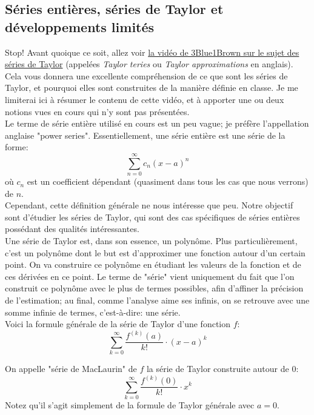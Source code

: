 \documentclass{article}
\begin{document}
\subsection{Séries entières, séries de Taylor et développements limités}
Stop! Avant quoique ce soit, allez voir \href{https://www.youtube.com/watch?v=3d6DsjIBzJ4}{la vidéo de 3Blue1Brown sur le sujet des séries de Taylor} (appelées \emph{Taylor teries} ou \emph{Taylor approximations} en anglais). Cela vous donnera une excellente compréhension de ce que sont les séries de Taylor, et pourquoi elles sont construites de la manière définie en classe. Je me limiterai ici à résumer le contenu de cette vidéo, et à apporter une ou deux notions vues en cours qui n'y sont pas présentées. \\

Le terme de série entière utilisé en cours est un peu vague; je préfère l'appellation anglaise "power series". Essentiellement, une série entière est une série de la forme:
\begin{equation*}
	\sum_{n = 0}^\infty c_n (x-a)^n
\end{equation*}
où \(c_n\) est un coefficient dépendant (quasiment dans tous les cas que nous verrons) de \(n\). \\
Cependant, cette définition générale ne nous intéresse que peu. Notre objectif sont d'étudier les séries de Taylor, qui sont des cas spécifiques de séries entières possédant des qualités intéressantes. \\

Une série de Taylor est, dans son essence, un polynôme. Plus particulièrement, c'est un polynôme dont le but est d'approximer une fonction autour d'un certain point. On va construire ce polynôme en étudiant les valeurs de la fonction et de ces dérivées en ce point. Le terme de "série" vient uniquement du fait que l'on construit ce polynôme avec le plus de termes possibles, afin d'affiner la précision de l'estimation; au final, comme l'analyse aime ses infinis, on se retrouve avec une somme infinie de termes, c'est-à-dire: une série. \\

Voici la formule générale de la série de Taylor d'une fonction \(f\):
\begin{equation}
	\boxed{ \sum_{k=0}^\infty \dfrac{f^{(k)}(a)}{k!} \cdot (x-a)^k }
\end{equation}

On appelle "série de MacLaurin" de \(f\) la série de Taylor construite autour de 0:
\begin{equation}
	\boxed{ \sum_{k=0}^\infty \dfrac{f^{(k)}(0)}{k!} \cdot x^k }
\end{equation}
Notez qu'il s'agit simplement de la formule de Taylor générale avec \(a = 0\).
\end{document}
